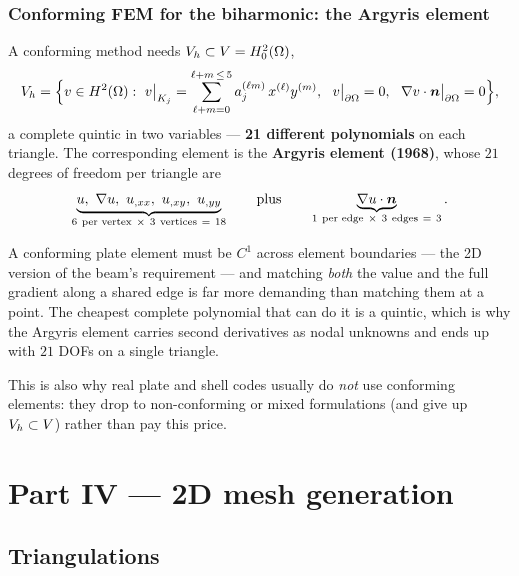 \subsubsection*{Conforming FEM for the biharmonic: the Argyris element}

A conforming method needs $V_{h}\subset V=H^{2}_{0}(\Omega)$, \ie
\begin{equation}\label{eq:l13argyrisV}
  V_{h}=\Bigl\{v\in H^{2}(\Omega):\
  v\big|_{K_{j}}=\sum_{\ell+m=0}^{\ell+m\,\le\,5}a^{(\ell m)}_{j}\,x^{(\ell)}y^{(m)},
  \ \ v\big|_{\partial\Omega}=0,\ \ \nabla v\cdot\bm{n}\big|_{\partial\Omega}=0\Bigr\},
\end{equation}
a complete quintic in two variables --- \textbf{21 different polynomials} on
each triangle. The corresponding element is the \textbf{Argyris element
(1968)}, whose $21$ degrees of freedom per triangle are
\begin{equation}\label{eq:l13argyrisdofs}
  \underbrace{u,\ \grad u,\ u_{,xx},\ u_{,xy},\ u_{,yy}}_{6\ \text{per vertex}\ \times\ 3\ \text{vertices}\ =\ 18}
  \qquad\text{plus}\qquad
  \underbrace{\grad u\cdot\nn}_{1\ \text{per edge}\ \times\ 3\ \text{edges}\ =\ 3}.
\end{equation}

\begin{mechanics}
A conforming plate element must be $C^{1}$ across element boundaries --- the
2D version of the beam's requirement --- and matching \emph{both} the value and
the full gradient along a shared edge is far more demanding than matching them
at a point. The cheapest complete polynomial that can do it is a quintic, which
is why the Argyris element carries second derivatives as nodal unknowns and
ends up with $21$ DOFs on a single triangle.

This is also why real plate and shell codes usually do \emph{not} use
conforming elements: they drop to non-conforming or mixed formulations (and
give up $V_{h}\subset V$) rather than pay this price.
\end{mechanics}

\section*{Part IV --- 2D mesh generation}
\subsection*{Triangulations}

